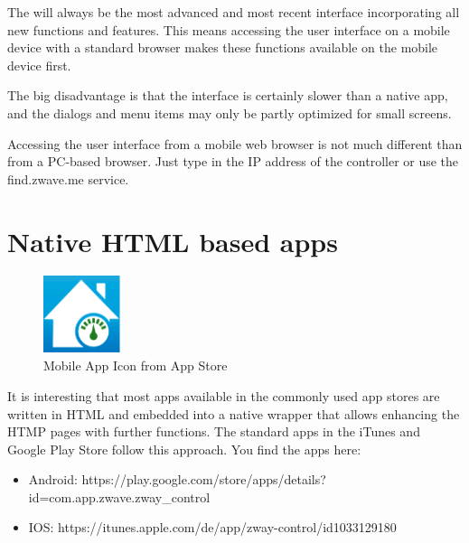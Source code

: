 The \zwshui will always be the most advanced and most recent interface 
incorporating all new functions and features. This means accessing the user interface 
on a mobile device with a standard browser makes these functions available on the 
mobile device first.

The big disadvantage is that the interface is certainly slower than a native app, and the 
dialogs and menu items may only be partly optimized for small screens.

Accessing the user interface from a mobile web browser is not much different than from a 
PC-based browser. Just type in the IP address of the controller or use the find.zwave.me service.

\section{Native HTML based apps}

\begin{figure}
\begin{center}
\includegraphics[width=0.2\textwidth]{pngs/cap5/mobile2.png}
\caption{Mobile App Icon from App Store}
\label{mobile2}
\end{center}
\end{figure}

It is interesting that most apps available in the commonly used app stores are written 
in HTML and embedded into a native wrapper that allows enhancing the HTMP pages with 
further functions. The standard \zway apps in the iTunes and Google Play Store follow 
this approach. You find the apps here:

\begin{itemize}
\item Android: https://play.google.com/store/apps/details?id=com.app.zwave.zway\_control
\item IOS: https://itunes.apple.com/de/app/zway-control/id1033129180
\end{itemize}


